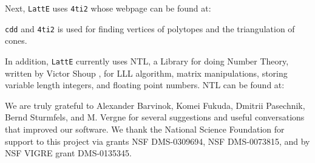 \documentclass{article}
\newcommand{\latte}{{\tt LattE}\xspace}
\newcommand{\fourtitwo}{{\tt 4ti2}\xspace}
\begin{document}

Next, \latte uses \fourtitwo \cite{4ti2} whose webpage can be found at:


{\tt cdd} and \fourtitwo is used for finding vertices of polytopes and the
triangulation of cones.

In addition, {\tt LattE} currently uses NTL, a
Library for doing Number Theory, written by Victor Shoup \cite{shoup},
for LLL algorithm, matrix manipulations, storing variable length
integers, and floating point numbers.  NTL can be found at:


We are truly grateful to Alexander Barvinok, Komei Fukuda, Dmitrii
Pasechnik, Bernd Sturmfels, and M. Vergne for several suggestions and
useful conversations that improved our software.  We thank the National
Science Foundation for support to this project via grants NSF
DMS-0309694, NSF DMS-0073815, and by NSF VIGRE grant DMS-0135345.




\end{document}
